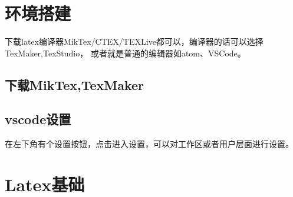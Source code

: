 \documentclass{article}
\begin{document}
  \section{环境搭建}
  下载latex编译器MikTex/CTEX/TEXLive都可以，编译器的话可以选择TexMaker,TexStudio，
  或者就是普通的编辑器如atom、VSCode。
    \subsection{下载MikTex,TexMaker}


    \subsection{vscode设置}
    在左下角有个设置按钮，点击进入设置，可以对工作区或者用户层面进行设置。





  \section{Latex基础}
\end{document}
